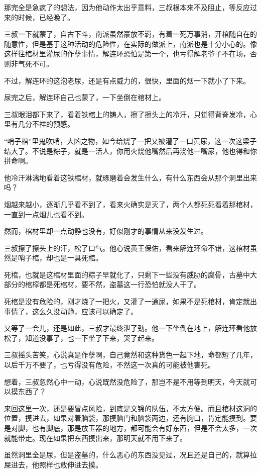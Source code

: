 那完全是急疯了的想法，因为他动作太出乎意料，三叔根本来不及阻止，等反应过来的时候，已经晚了。

三叔一下就蒙了，自古下斗，南派虽然豪放不羁，有着一死万事消，开棺随自在的随意性，但是基于这种活动的危险性，在实际的做派上，南派也是十分小心的。像这样往棺材里灌尿的作孽事情，解连环恐怕是第一个，也亏得解老爷子不在场，否则非气死不可。

不过，解连环的这泡老尿，还是有点威力的，很快，里面的烟一下就小了下来。

尿完之后，解连环自己也蒙了，一下坐倒在棺材上。

三叔眼泪都下来了，看着铁棺上的铸人，擦了擦头上的冷汗，只觉得背脊发冷，心里有几分不祥的预感。

“哨子棺”里鬼吹哨，大凶之物，如今给烧了一把又被灌了一口黄尿，这一次这梁子结大了。不说是粽子，就是一活人，你用火烧他嘴然后再浇他一嘴尿，他也得和你拼命啊。

他冷汗淋漓地看着这铁棺材，就琢磨着会发生什么，有什么东西会从那个洞里出来吗？

烟越来越小，逐渐几乎看不到了，看来火确实是灭了，两个人都死死看着那棺材，一直到一点烟儿也看不到。

然而，棺材里却一点动静也没有，好似刚才的事情从来没发生过。

三叔擦了擦头上的汗，松了口气。他心说黄王保佑，看来解连环命不错，这棺材虽然是哨子棺，却也是一具死棺。

死棺，也就是这棺材里面的粽子早就化了，只剩下一些没有威胁的腐骨，古墓中大部分的棺椁都是死棺材，要不然，盗墓这一行恐怕就没人干了。

死棺是没有危险的，刚才烧了一把火，又灌了一通尿，如果不是死棺材，肯定就出事情了，这么久没动静，应该可以确定了。

又等了一会儿，还是如此，三叔才最终泄了劲。他一下坐倒在地上，解连环看他放松了，知道没事了，也一下坐了下来，哭了起来。

三叔摇头苦笑，心说真是作孽啊，自己竟然和这种货色一起下地，命都短了几年，以后千万不要了，也亏得没有危险，不然这一次真的可能被他害死。

想着，三叔忽然心中一动，心说既然没危险了，那岂不是不用等到明天，今天就可以摸东西了？

来回这里一次，还是要冒点风险，到底是文锦的队伍，不太方便。而且棺材这洞的位置，摸进去，如果对着脑袋，那摸脑门和脑袋两边，还有胸口，肯定能摸到。要是对脚，也有脚底，那是放玉器的地方，都可能会有好东西，但是不会太多，一次就能带走。现在如果把东西摸出来，那明天就不用下来了。

虽然洞里全是尿，但是盗墓的，什么恶心的东西没见过，况且还是自己的，就算拉屎进去，他照样也敢伸进去摸。

